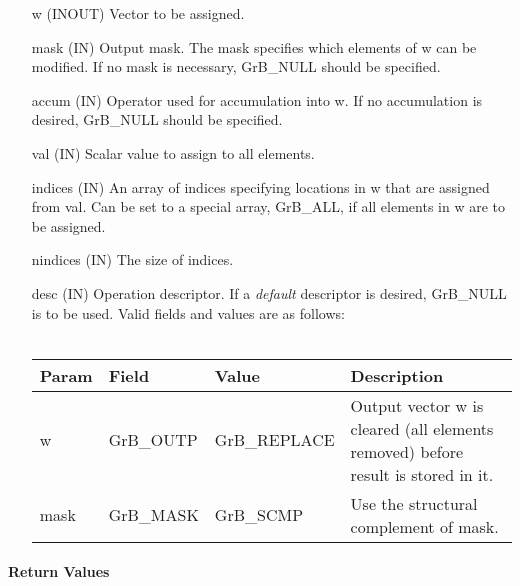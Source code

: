 \begin{itemize}[leftmargin=1.1in]
    \item[{\sf w}]   ({\sf INOUT}) Vector to be assigned.

    \item[{\sf mask}]     ({\sf IN}) Output mask. The mask specifies which elements
                              of {\sf w} can be modified. If no mask is necessary, 
                              {\sf GrB\_NULL} should be specified.

    \item[{\sf accum}]    ({\sf IN}) Operator used for accumulation into {\sf w}.
                              If no accumulation is desired, {\sf GrB\_NULL} 
                              should be specified.

    \item[{\sf val}]      ({\sf IN}) Scalar value to assign to all elements.
    \item[{\sf indices}]  ({\sf IN}) An array of indices specifying locations in
                              {\sf w} that are assigned from {\sf val}.  Can be set
                              to a special array, {\sf GrB\_ALL}, if all elements
                              in {\sf w} are to be assigned.
    \item[{\sf nindices}] ({\sf IN}) The size of {\sf indices}.

    \item[{\sf desc}]     ({\sf IN}) Operation descriptor. If a
    \emph{default} descriptor is desired, {\sf GrB\_NULL} is to be
    used. Valid fields and values are as follows: \\ ~\\
    \begin{tabular}{lllp{2.5in}}
    Param & Field  & Value & Description \\
    \hline
    {\sf w}    & {\sf GrB\_OUTP} & {\sf GrB\_REPLACE} & Output vector {\sf w} is cleared (all elements removed) before result is stored in it.\\
    {\sf mask} & {\sf GrB\_MASK} & {\sf GrB\_SCMP}   & Use the structural complement of {\sf mask}. \\
    \end{tabular}

\end{itemize}

\paragraph{Return Values}

